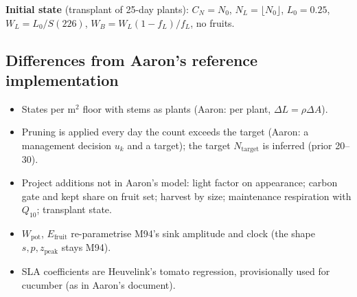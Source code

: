 \documentclass[11pt,a4paper]{article}
\begin{document}
\textbf{Initial state} (transplant of 25-day plants): $C_N=N_0$, $N_L=\lfloor N_0\rfloor$, $L_0=0.25$,
$W_L=L_0/S(226)$, $W_B=W_L(1-f_L)/f_L$, no fruits.

\subsection{Differences from Aaron's reference implementation}
\begin{itemize}[nosep]
\item States per m$^2$ floor with stems as plants (Aaron: per plant, $\Delta L=\rho\Delta A$).
\item Pruning is applied every day the count exceeds the target (Aaron: a management decision $u_k$ and a target);
the target $N_{\text{target}}$ is inferred (prior 20--30).
\item Project additions not in Aaron's model: light factor on appearance; carbon gate and kept share on fruit set;
harvest by size; maintenance respiration with $Q_{10}$; transplant state.
\item $W_{\text{pot}}$, $E_{\text{fruit}}$ re-parametrise M94's sink amplitude and clock (the shape $s,p,z_{\text{peak}}$
stays M94).
\item SLA coefficients are Heuvelink's tomato regression, provisionally used for cucumber (as in Aaron's document).
\end{itemize}
\end{document}
